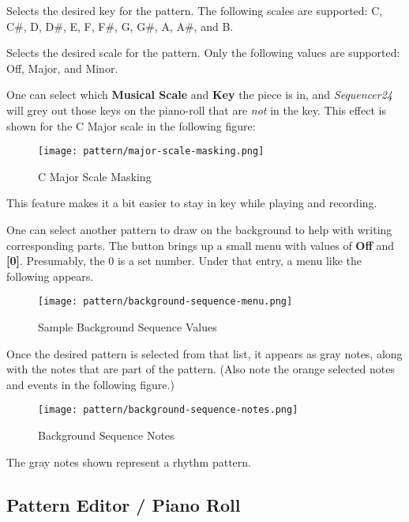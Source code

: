    Selects the desired key for the pattern.  The following scales are
   supported:  C, C\#, D, D\#, E, F, F\#, G, G\#, A, A\#, and B.

   Selects the desired scale for the pattern.
   Only the following values are supported: Off, Major, and Minor.

   One can select which \textbf{Musical Scale} and
   \textbf{Key} the piece is in,
   and \textsl{Sequencer24} will grey out those keys on the piano-roll that
   are \textsl{not} in the key.
   This effect is shown for the C Major scale in the following figure:

\begin{figure}[H]
   \centering 
   \texttt{[image: pattern/major-scale-masking.png]}
   \caption{C Major Scale Masking}
   \label{fig:pattern_editor_major_scale_masking}
\end{figure}

   This feature makes it a bit easier to stay in key while playing and
   recording.

   One can select another pattern to draw on the background to help with
   writing corresponding parts.
   The button brings up a small menu with values of \textbf{Off} and
   \textbf{[0]}.  Presumably, the 0 is a set number.  Under that entry, a
   menu like the following appears.

\begin{figure}[H]
   \centering 
   \texttt{[image: pattern/background-sequence-menu.png]}
   \caption{Sample Background Sequence Values}
   \label{fig:pattern_editor_background_sequence_menu}
\end{figure}

   Once the desired pattern is selected from that list, it appears as
   gray notes, along with the notes that are part of the pattern.  (Also
   note the orange selected notes and events in the following figure.)

\begin{figure}[H]
   \centering 
   \texttt{[image: pattern/background-sequence-notes.png]}
   \caption{Background Sequence Notes}
   \label{fig:pattern_editor_background_sequence_notes}
\end{figure}

   The gray notes shown represent a rhythm pattern.

\subsection{Pattern Editor / Piano Roll}
\label{subsec:seq24_pattern_editor_piano_roll}

